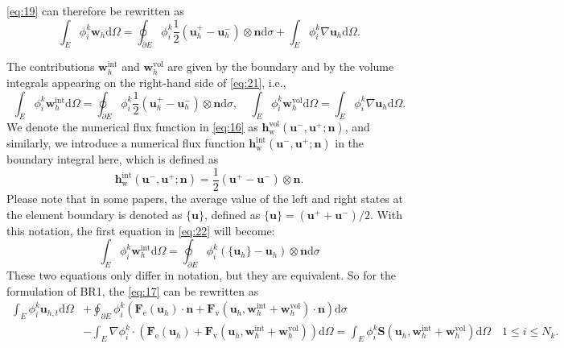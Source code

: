 \documentclass{develop-note}
\begin{document}
\autoref{eq:19} can therefore be rewritten as
\begin{equation}
  \label{eq:21}
  \int_{E}\phi_{i}^{k}\mathbf{w}_{h}\mathrm{d}\Omega=\oint_{\partial E}\phi_{i}^{k}\dfrac{1}{2}(\mathbf{u}_{h}^{+}-\mathbf{u}_{h}^{-})\otimes\mathbf{n}\mathrm{d}\sigma+\int_{E}\phi_{i}^{k}\nabla\mathbf{u}_{h}\mathrm{d}\Omega.
\end{equation}

The contributions $\mathbf{w}_{h}^{\mathrm{int}}$ and $\mathbf{w}_{h}^{\mathrm{vol}}$ are given by the boundary and by the volume integrals appearing on the right-hand side of \autoref{eq:21}, i.e.,
\begin{equation}
  \label{eq:22}
  \int_{E}\phi_{i}^{k}\mathbf{w}_{h}^{\mathrm{int}}\mathrm{d}\Omega=\oint_{\partial E}\phi_{i}^{k}\dfrac{1}{2}(\mathbf{u}_{h}^{+}-\mathbf{u}_{h}^{-})\otimes\mathbf{n}\mathrm{d}\sigma,\quad \int_{E}\phi_{i}^{k}\mathbf{w}_{h}^{\mathrm{vol}}\mathrm{d}\Omega=\int_{E}\phi_{i}^{k}\nabla\mathbf{u}_{h}\mathrm{d}\Omega.
\end{equation}
We denote the numerical flux function in \autoref{eq:16} as $\mathbf{h}_{\mathrm{w}}^{\mathrm{vol}}(\mathbf{u}^{-},\mathbf{u}^{+};\mathbf{n})$, and similarly, we introduce a numerical flux function $\mathbf{h}_{\mathrm{w}}^{\mathrm{int}}(\mathbf{u}^{-},\mathbf{u}^{+};\mathbf{n})$ in the boundary integral here, which is defined as
\begin{equation}
  \mathbf{h}_{\mathrm{w}}^{\mathrm{int}}(\mathbf{u}^{-},\mathbf{u}^{+};\mathbf{n})=\dfrac{1}{2}(\mathbf{u}^{+}-\mathbf{u}^{-})\otimes\mathbf{n}.
\end{equation}
Please note that in some papers, the average value of the left and right states at the element boundary is denoted as $\{\mathbf{u}\}$, defined as $\{\mathbf{u}\}=(\mathbf{u}^{+}+\mathbf{u}^{-})/2$. With this notation, the first equation in \autoref{eq:22} will become:
\begin{equation}
  \int_{E}\phi_{i}^{k}\mathbf{w}_{h}^{\mathrm{int}}\mathrm{d}\Omega=\oint_{\partial E}\phi_{i}^{k}(\{\mathbf{u}_{h}\}-\mathbf{u}_{h})\otimes\mathbf{n}\mathrm{d}\sigma
\end{equation}
These two equations only differ in notation, but they are equivalent. So for the formulation of BR1, the \autoref{eq:17} can be rewritten as
\begin{equation}
  \label{eq:24}
  \begin{aligned}
    \int_{E}\phi_{i}^{k}\mathbf{u}_{h,t}\mathrm{d}\Omega &+\oint_{\partial E}\phi_{i}^{k}(\mathbf{F}_{\mathrm{e}}(\mathbf{u}_{h})\cdot\mathbf{n}+\mathbf{F}_{\mathrm{v}}(\mathbf{u}_{h},\mathbf{w}_{h}^{\mathrm{int}}+\mathbf{w}_{h}^{\mathrm{vol}})\cdot\mathbf{n})\mathrm{d}\sigma\\
    &-\int_{E}\nabla\phi_{i}^{k}\cdot(\mathbf{F}_{\mathrm{e}}(\mathbf{u}_{h})+\mathbf{F}_{\mathrm{v}}(\mathbf{u}_{h},\mathbf{w}_{h}^{\mathrm{int}}+\mathbf{w}_{h}^{\mathrm{vol}}))\mathrm{d}\Omega=\int_{E}\phi_{i}^{k}\mathbf{S}(\mathbf{u}_{h},\mathbf{w}_{h}^{\mathrm{int}}+\mathbf{w}_{h}^{\mathrm{vol}})\mathrm{d}\Omega\quad 1\leqslant i\leqslant N_{k}.
  \end{aligned}
\end{equation}
\end{document}
